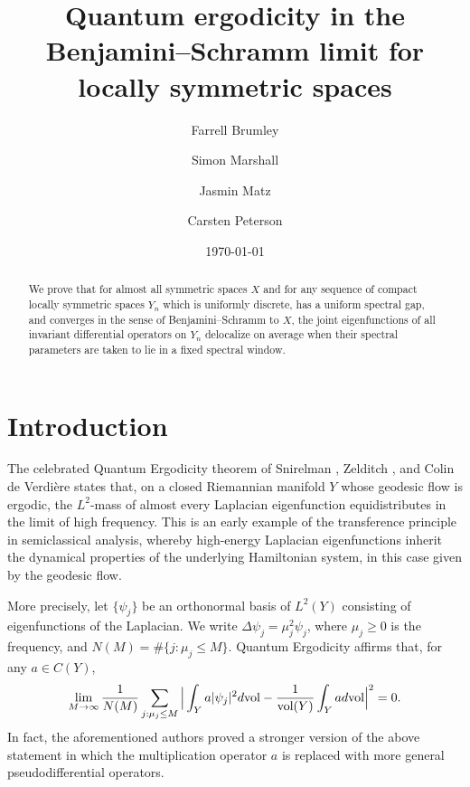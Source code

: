 \documentclass[12pt]{amsart}
\title{Quantum ergodicity in the Benjamini--Schramm limit for locally symmetric spaces}
\date{\today}
\author{Farrell Brumley}
\author{Simon Marshall}
\author{Jasmin Matz}
\author{Carsten Peterson}
\theoremstyle{remark}
\begin{document}
\begin{abstract}
We prove that for almost all symmetric spaces $X$ and for any sequence of compact locally symmetric spaces $Y_n$ which is uniformly discrete, has a uniform spectral gap, and converges in the sense of Benjamini--Schramm to $X$, the joint eigenfunctions of all invariant differential operators on $Y_n$ delocalize on average when their spectral parameters are taken to lie in a fixed spectral window.
\end{abstract}


\maketitle

\setcounter{tocdepth}{1}
\tableofcontents

\section{Introduction}

The celebrated Quantum Ergodicity theorem of Snirelman \cite{Snirelman}, Zelditch \cite{Zelditch_87}, and Colin de Verdi\`ere \cite{Colin_de_Verdiere} states that, on a closed Riemannian manifold $Y$ whose geodesic flow is ergodic, the $L^2$-mass of almost every Laplacian eigenfunction equidistributes in the limit of high frequency. This is an early example of the transference principle in semiclassical analysis, whereby high-energy Laplacian eigenfunctions inherit the dynamical properties of the underlying Hamiltonian system, in this case given by the geodesic flow.

More precisely, let $\{\psi_j\}$ be an orthonormal basis of $L^2(Y)$ consisting of eigenfunctions of the Laplacian. We write $\Delta \psi_j = \mu_j^2 \psi_j$, where $\mu_j \ge 0$ is the frequency, and $N(M) = \#\{j : \mu_j \leq M\}$. Quantum Ergodicity affirms that, for any $a \in C(Y)$,
\[
\lim_{M\rightarrow\infty}    \frac{1}{N(M)} \sum_{j: \mu_j \leq M} \Big| \int_{Y} a |\psi_j|^2 d \textnormal{vol} - \frac{1}{\textnormal{vol}(Y)} \int_{Y} a d \textnormal{vol} \Big|^2 = 0.
\]
In fact, the aforementioned authors proved a stronger version of the above statement in which the multiplication operator $a$ is replaced with more general pseudodifferential operators.
\end{document}
